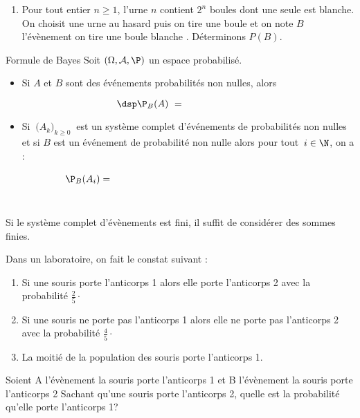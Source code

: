 \documentclass[a4paper,10pt]{report}
\begin{document}
\begin{enumerate}
\begin{itemize}
\begin{Exemple}
\begin{enumerate}
\vspace{5cm}
\item Pour tout entier $n \geq 1$, l'urne $n$ contient $2^n$ boules dont une seule est blanche. On choisit une urne au hasard puis on tire une boule et on note $B$ l'évènement \og on tire une boule blanche \fg . Déterminons $P(B)$. 

\vspace{6cm}
\end{enumerate}
\end{Exemple}

\begin{Proposition}{Formule de Bayes}
Soit $(\Omega, \mathcal{A}, \P)$ un espace probabilisé.
\begin{itemize}
\item Si $A$ et $B$ sont des événements probabilités non nulles, alors

\[ \dsp \P_B(A)\ = \qquad \qquad \qquad \qquad \]

\item Si $\ \big(A_k\big)_{k \geq 0}\ $ est un système complet d'événements de probabilités non nulles et si $B$ est un événement de probabilité non nulle alors pour tout $\,i\in\N$, on a :
$$\P_B(A_i) = \phantom{\frac{\ \P(A_i)\times  \P_{A_i}(B)\ }{ \P(B)} 
= \frac{\P(A_i)\times  \P_{A_i}(B)}{\ \sum\limits_{k=0}^{+\infty} \P(A_k)\times  \P_{A_k}(B)\ }}$$
\end{itemize}
\end{Proposition}

\begin{Remarque}{} Si le système complet d'évènements est fini, il suffit de considérer des sommes finies.
\end{Remarque}

\begin{Exemple} Dans un laboratoire, on fait le constat suivant :
\begin{enumerate}
\item Si une souris porte l'anticorps 1 alors elle porte l'anticorps 2 avec la probabilité $\frac{2}{5} \cdot$

\vspace{-0.2cm}
\item Si une souris ne porte pas l'anticorps 1 alors elle ne porte pas l'anticorps 2 avec la probabilité $\frac{4}{5} \cdot$
\item La moitié de la population des souris porte l'anticorps 1.
\end{enumerate}

\medskip
Soient A l'évènement \og la souris porte l'anticorps 1 \fg et B l'évènement \og la souris porte l'anticorps 2 \fg 
Sachant qu'une souris porte l'anticorps 2, quelle est la probabilité qu'elle porte l'anticorps 1?


\end{Exemple}
\end{itemize}
\end{enumerate}
\end{document}
